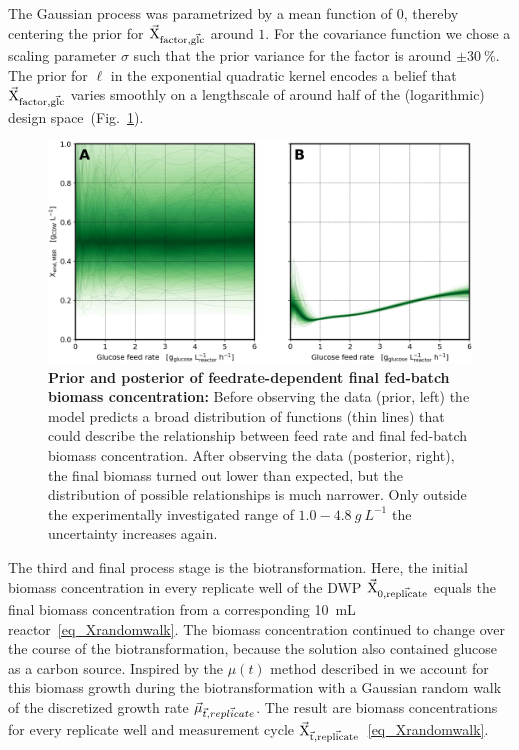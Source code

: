 \documentclass[sn-standardnature]{sn-jnl}%
\def\vec{\mathaccent "017E\relax }
\theoremstyle{thmstyleone}%
\theoremstyle{thmstyletwo}%
\theoremstyle{thmstylethree}%
\begin{document}
The Gaussian process was parametrized by a mean function of $0$, thereby centering the prior for $\mathrm{\vec{X}_{factor,\vec{glc}}}$ around $1$.
For the covariance function we chose a scaling parameter $\sigma$ such that the prior variance for the factor is around $\pm30\ \%$.
The prior for $\ell$ in the exponential quadratic kernel encodes a belief that $\mathrm{\vec{X}_{factor,\vec{glc}}}$ varies smoothly on a lengthscale of around half of the (logarithmic) design space~(Fig.~\ref{fig_gpXfactor}).

\begin{figure}[h]
    \centering
    \includegraphics[width=1.0\textwidth]{figures/plot_gp_X_factor.png}
    \caption{
        \textbf{Prior and posterior of feedrate-dependent final fed-batch biomass concentration:}
        Before observing the data (prior, left) the model predicts a broad distribution of functions (thin lines) that could describe the relationship between feed rate and final fed-batch biomass concentration.
        After observing the data (posterior, right), the final biomass turned out lower than expected, but the distribution of possible relationships is much narrower.
        Only outside the experimentally investigated range of $1.0-4.8\ g\ L^{-1}$ the uncertainty increases again.
    }
    \label{fig_gpXfactor}
\end{figure}

The third and final process stage is the biotransformation.
Here, the initial biomass concentration in every replicate well of the DWP $\mathrm{\vec{X}_{0,\vec{replicate}}}$ equals the final biomass concentration from a corresponding 10~mL reactor~\eqref{eq_Xrandomwalk}.
The biomass concentration continued to change over the course of the biotransformation, because the solution also contained glucose as a carbon source.
Inspired by the $\mu(t)$ method described in \cite{bletlPaper} we account for this biomass growth during the biotransformation with a Gaussian random walk of the discretized growth rate $\vec{\mu}_{\vec{t},\vec{replicate}}$.
The result are biomass concentrations for every replicate well and measurement cycle $\mathrm{\vec{X}_{\vec{t},\vec{replicate}}}$~\eqref{eq_Xrandomwalk}.
\end{document}
